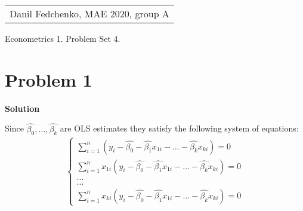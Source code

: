 \documentclass[a4paper]{article}
\newcommand{\summa}{\sum_{i=1}^n}
\begin{document}
	\begin{flushright}
	\begin{tabular}{r}
		Danil Fedchenko, MAE 2020, group A \\
	\end{tabular}
\end{flushright}


\begin{center}
	Econometrics 1. Problem Set 4.
\end{center}
\section*{Problem 1}

\textbf{Solution}


Since $\hat{\beta_0}, \dots, \hat{\beta_k}$ are OLS estimates they satisfy the following system of equations:
\begin{align}\label{eq1}
\begin{cases}
\summa (y_i - \hat{\beta_0} - \hat{\beta_1}x_{1i} - \dots - \hat{\beta_k}x_{ki}) = 0\\
\summa x_{1i}(y_i - \hat{\beta_0} - \hat{\beta_1}x_{1i} - \dots - \hat{\beta_k}x_{ki}) = 0\\
\dots\\
\dots\\
\summa x_{ki}(y_i - \hat{\beta_0} - \hat{\beta_1}x_{1i} - \dots - \hat{\beta_k}x_{ki}) = 0
\end{cases}
\end{align}
\end{document}
